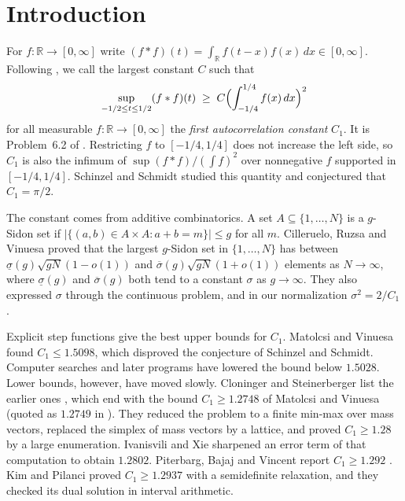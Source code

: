 \documentclass[11pt]{amsart}
\theoremstyle{definition}
\theoremstyle{remark}
\numberwithin{equation}{section}
\newcommand{\R}{\mathbb{R}}
\begin{document}
\maketitle

\section{Introduction}\label{sec:intro}

For $f\colon\R\to[0,\infty]$ write $(f*f)(t)=\int_\R f(t-x)f(x)\,dx\in[0,\infty]$. Following \cite{AE25}, we call the largest constant $C$ such that
\begin{equation}\label{eq:ineq}
\sup_{-1/2\le t\le 1/2}(f*f)(t)\;\ge\;C\Bigl(\int_{-1/4}^{1/4}f(x)\,dx\Bigr)^2
\end{equation}
for all measurable $f\colon\R\to[0,\infty]$ the \emph{first autocorrelation constant} $C_1$. It is Problem~6.2 of \cite{GGTW25}. Restricting $f$ to $[-1/4,1/4]$ does not increase the left side, so $C_1$ is also the infimum of $\sup(f*f)/(\int f)^2$ over nonnegative $f$ supported in $[-1/4,1/4]$. Schinzel and Schmidt \cite{SS02} studied this quantity and conjectured that $C_1=\pi/2$.

The constant comes from additive combinatorics. A set $A\subseteq\{1,\dots,N\}$ is a $g$-Sidon set if $|\{(a,b)\in A\times A:a+b=m\}|\le g$ for all $m$. Cilleruelo, Ruzsa and Vinuesa \cite{CRV10} proved that the largest $g$-Sidon set in $\{1,\dots,N\}$ has between $\underline\sigma(g)\sqrt{gN}(1-o(1))$ and $\overline\sigma(g)\sqrt{gN}(1+o(1))$ elements as $N\to\infty$, where $\underline\sigma(g)$ and $\overline\sigma(g)$ both tend to a constant $\sigma$ as $g\to\infty$. They also expressed $\sigma$ through the continuous problem, and in our normalization $\sigma^2=2/C_1$ \cite[Section 1.2]{CS17}.

Explicit step functions give the best upper bounds for $C_1$. Matolcsi and Vinuesa \cite{MV10} found $C_1\le 1.5098$, which disproved the conjecture of Schinzel and Schmidt. Computer searches \cite{AE25,GGTW25} and later programs \cite{EA26,Jana26} have lowered the bound below $1.5028$. Lower bounds, however, have moved slowly. Cloninger and Steinerberger list the earlier ones \cite[Section 1.2]{CS17}, which end with the bound $C_1\ge1.2748$ of Matolcsi and Vinuesa \cite{MV10} (quoted as $1.2749$ in \cite{CS17}). They reduced the problem to a finite min-max over mass vectors, replaced the simplex of mass vectors by a lattice, and proved $C_1\ge 1.28$ by a large enumeration. Ivanisvili and Xie \cite{IX26} sharpened an error term of that computation to obtain $1.2802$. Piterbarg, Bajaj and Vincent report $C_1\ge1.292$ \cite{PBV26}. Kim and Pilanci \cite{KP26} proved $C_1\ge 1.2937$ with a semidefinite relaxation, and they checked its dual solution in interval arithmetic.
\end{document}
